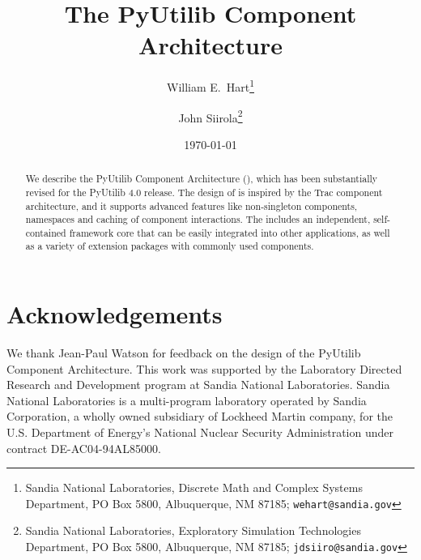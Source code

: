 \documentclass[12pt]{article}
\begin{document}
\title{The PyUtilib Component Architecture}

\author{William E.\ Hart\footnote{Sandia National Laboratories, 
Discrete Math and Complex Systems Department, 
PO Box 5800, Albuquerque, NM 87185;
{\tt wehart@sandia.gov}}
\and
John Siirola\footnote{Sandia National Laboratories,
Exploratory Simulation Technologies Department, 
PO Box 5800, Albuquerque, NM 87185;
{\tt jdsiiro@sandia.gov}}
}

\date{\today}

\maketitle

\begin{abstract}
We describe the PyUtilib Component Architecture (\pca), which has
been substantially revised for the PyUtilib 4.0 release. The design
of \pcasp is inspired by the Trac component architecture, and it
supports advanced features like non-singleton components, namespaces
and caching of component interactions. The \pcasp includes an
independent, self-contained framework core that can be easily
integrated into other applications, as well as a variety of extension
packages with commonly used components.
\end{abstract}


\lstset{language=Python}
\lstset{aboveskip=1em,belowskip=1em,showspaces=false,showstringspaces=false}

\newpage
\tableofcontents
\newpage






\section*{Acknowledgements} 

We thank Jean-Paul Watson for feedback on the design of the PyUtilib
Component Architecture. This work was supported by the Laboratory
Directed Research and Development program at Sandia National
Laboratories. Sandia National Laboratories is a multi-program
laboratory operated by Sandia Corporation, a wholly owned subsidiary
of Lockheed Martin company, for the U.S. Department of Energy's
National Nuclear Security Administration under contract DE-AC04-94AL85000.



%



\end{document}
